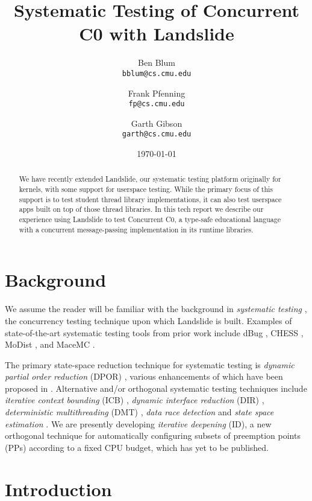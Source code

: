 \documentclass{article}
\title{{\bf Systematic Testing of Concurrent C0 with Landslide}}
\author{Ben Blum \\ \texttt{bblum@cs.cmu.edu}
	\and Frank Pfenning \\ \texttt{fp@cs.cmu.edu}
	\and Garth Gibson \\ \texttt{garth@cs.cmu.edu}}
\date{\today}
\begin{document}
\maketitle

\begin{abstract}
We have recently extended Landslide, our systematic testing platform originally for kernels, with some support for userspace testing. While the primary focus of this support is to test student thread library implementations, it can also test userspace apps built on top of those thread libraries. In this tech report we describe our experience using Landslide to test Concurrent C0, a type-safe educational language with a concurrent message-passing implementation in its runtime libraries.
\end{abstract}

\section{Background}

We assume the reader will be familiar with the background in {\em systematic testing} \cite{verisoft}, the concurrency testing technique upon which Landslide is built.
Examples of state-of-the-art systematic testing tools from prior work include dBug \cite{dbug-ssv,dbug-retreat,parrot}, CHESS \cite{chess}, MoDist \cite{modist}, and MaceMC \cite{macemc}.

The primary state-space reduction technique for systematic testing is {\em dynamic partial order reduction} (DPOR) \cite{dpor}, various enhancements of which have been proposed in \cite{distributed-dpor,sdpor,parallel-dpor,bpor,optimal-dpor}.
Alternative and/or orthogonal systematic testing techniques include {\em iterative context bounding} (ICB) \cite{chess}, {\em dynamic interface reduction} (DIR) \cite{demeter}, {\em deterministic multithreading} (DMT) \cite{peregrine,dthreads,kendo,parrot}, {\em data race detection} \cite{eraser,tsan} and {\em state space estimation} \cite{estimation}.
We are presently developing {\em iterative deepening} (ID), a new orthogonal technique for automatically configuring subsets of preemption points (PPs) according to a fixed CPU budget, which has yet to be published.

\section{Introduction}
\end{document}
